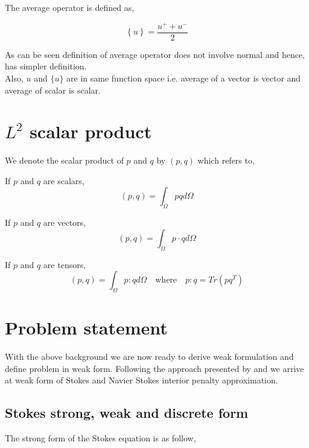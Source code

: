 \documentclass[a4paper]{book}
\begin{document}
The average operator is defined as,

\begin{equation}\label{average operator}
\left\lbrace u \right\rbrace = \frac{u^+ + u^-}{2}  
\end{equation} 

As can be seen definition of average operator does not involve normal and hence, has simpler definition.\\
Also, $u$ and $\lbrace u \rbrace$ are in same function space i.e. average of a vector is vector and average of scalar is scalar.\\

\section{$L^2$ scalar product}

We denote the scalar product of $p$ and $q$ by $(p,q)$ which refers to,

If $p$ and $q$ are scalars,
\begin{equation}\label{inner product scalars}
(p,q)=\int_{\Omega} pq d \Omega 
\end{equation}

If $p$ and $q$ are vectors,
\begin{equation}\label{Inner product vectors}
(p,q)=\int_{\Omega} p \cdot q d\Omega
\end{equation}

If $p$ and $q$ are tensors,
\begin{equation}\label{Inner product tensors}
(p,q)=\int_{\Omega} p:q d\Omega \quad \textrm{where} \quad p:q = Tr(pq^T)
\end{equation}

\section{Problem statement}

With the above background we are now ready to derive weak formulation and define problem in weak form. Following the approach presented by \cite{Montlaur} and \cite{Montlaur2} we arrive at weak form of Stokes and Navier Stokes interior penalty approximation.

\subsection{Stokes strong, weak and discrete form} \label{Stokes_flow_ch3}

The strong form of the Stokes equation is as follow,
\end{document}
